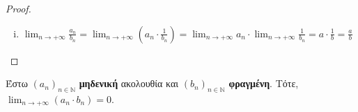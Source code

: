 \begin{proof}
\begin{enumerate}[i)]
\begin{proof}
      Για $ \varepsilon = \frac{\abs{b}}{2} >0 $ και λόγω 
      ότι $ \lim_{n \to +\infty} b_{n} = b $
      έχουμε ότι $ \exists n_{0} \in \mathbb{N} \; : \; 
      \forall n \geq n_{0} \quad \abs{b_{n}-b} 
      < \frac{\abs{b}}{2} $ 

      Άρα για $ n \geq n_{0} $, έχουμε 
      \begin{equation}\label{eq:idiot1/b}
        \abs{b} = \abs{b - b_{n} + b_{n}} \leq 
        \abs{b - b_{n}} + \abs{b_{n}} <
        \frac{\abs{b}}{2} + \abs{b_{n}} \Leftrightarrow 
        \abs{b_{n}} > \abs{b} -
        \frac{\abs{b}}{2} \Leftrightarrow \abs{b_{n}}  > 
        \frac{\abs{b}}{2} 
      \end{equation} 
      δηλαδή, $ b_{n} \neq 0, \; \forall n \geq n_{0} $.
      \qed 

      Οπότε, για $ n \geq n_{0} $ έχουμε ότι:

      \[ 
        \abs{\frac{1}{b_{n}} - \frac{1}{b}} = \abs{\frac{b-b_{n}}{b_{n}\cdot b}}
        = \frac{\abs{b-b_{n}} }{\abs{b_{n}} \cdot \abs{b}}
        \overset{\eqref{eq:idiot1/b}}{<} 
        \frac{2 \abs{b - b_{n}}}{\abs{b}^{2}} 
      \]

      Έστω $ \varepsilon >0 $, τότε επειδή 
      $ \lim_{n \to +\infty} b_{n} =b $, για 
      $ \frac{\varepsilon \abs{b} ^{2}}{2} > 0 $, έχουμε ότι
      \begin{equation}\label{eq:idiot1/b2}
        \exists n_{1} \in \mathbb{N} \; : \; \forall n 
        \geq n_{1} \quad \abs{b - b_{n}} <
        \frac{\varepsilon \abs{b}^{2}}{2}
      \end{equation} 

      Επιλέγουμε $ n_{2} = \max \{ n_{0}, n_{1} \} $. 
      Τότε $ \forall n \geq n_{2} $ ισχύει ότι 
      \[
        \abs{\frac{1}{b_{n}} - \frac{1}{b}} < 
        \frac{2 \abs{b -b_{n}}}{\abs{b} ^{2}} 
        \overset{\eqref{eq:idiot1/b2}}{<}  \varepsilon 
      \] 
    \end{proof}

  \item 
    $ \lim_{n \to +\infty} \frac{a_{n}}{b_{n}} = 
    \lim_{n \to +\infty} \left(a_{n}\cdot \frac{1}{b_{n}}
    \right) = \lim_{n \to +\infty} a_{n} \cdot \lim_{n \to +\infty} 
    \frac{1}{b_{n}} = a \cdot \frac{1}{b} = \frac{a}{b} $
\end{enumerate}
\end{proof}

\begin{mybox3}
  \begin{prop}
    Έστω $ (a_{n})_{n \in \mathbb{N}} $ \textbf{μηδενική} ακολουθία και 
    $ (b_{n})_{n \in \mathbb{N}} $ 
    \textbf{φραγμένη}. Τότε, $ \lim_{n \to +\infty} (a_{n}\cdot b_{n}) = 0 $.
  \end{prop}
\end{mybox3}

